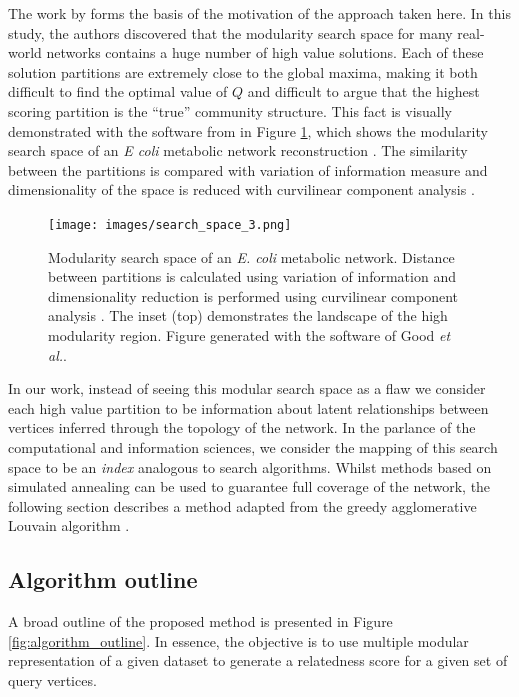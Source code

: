 \documentclass[manuscript, proceedings]{acmart}
\begin{document}
The work by \cite{good2010performance} forms the basis of the motivation of the approach taken here.
In this study, the authors discovered that the modularity search space for many real-world networks contains a huge number of high value solutions.
Each of these solution partitions are extremely close to the global maxima, making it both difficult to find the optimal value of $Q$ and difficult to argue that the highest scoring partition is the ``true'' community structure.
This fact is visually demonstrated with the software from \cite{good2010performance} in Figure \ref{fig:modular_search_space}, which shows the modularity search space of an \textit{E coli} metabolic network reconstruction \cite{GuimeraNature2005}.
The similarity between the partitions is compared with variation of information measure \cite{meilua2003comparing} and dimensionality of the space is reduced with curvilinear component analysis \cite{demartines1997curvilinear}.

\begin{figure}
\centering
 \texttt{[image: images/search\_space\_3.png]}
 \caption{
 Modularity search space of an \textit{E. coli} metabolic network.
 Distance between partitions is calculated using variation of information \cite{meilua2003comparing} and dimensionality reduction is performed using curvilinear component analysis \cite{demartines1997curvilinear}.
  The inset (top) demonstrates the landscape of the high modularity region. 
  Figure generated with the software of Good \textit{et al.}\cite{good2010performance}.
 }
 \label{fig:modular_search_space}
\end{figure}

In our work, instead of seeing this modular search space as a flaw we consider each high value partition to be information about latent relationships between vertices inferred through the topology of the network.
In the parlance of the computational and information sciences, we consider the mapping of this search space to be an \textit{index} analogous to search algorithms.
Whilst methods based on simulated annealing can be used to guarantee full coverage of the network, the following section describes a method adapted from the greedy agglomerative Louvain algorithm \cite{blondel2008fast}.

\subsection{Algorithm outline}
A broad outline of the proposed method is presented in Figure \ref{fig:algorithm_outline}.
In essence, the objective is to use multiple modular representation of a given dataset to generate a relatedness score for a given set of query vertices.
\end{document}
